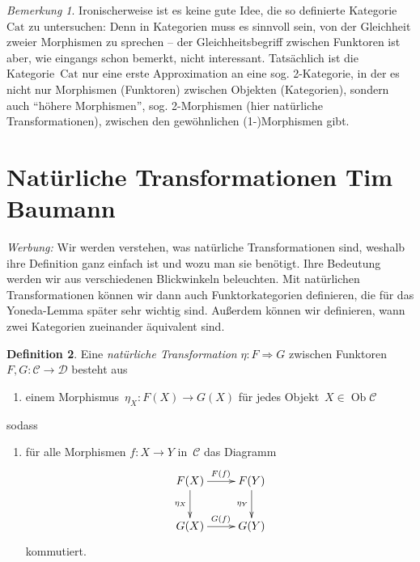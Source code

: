 \documentclass[a4paper,ngerman]{scrartcl}
\theoremstyle{definition}
\newtheorem{defn}{Definition}[section]
\theoremstyle{plain}
\theoremstyle{remark}
\newtheorem{bem}[defn]{Bemerkung}
\newcommand{\C}{\mathcal{C}}
\newcommand{\D}{\mathcal{D}}
\DeclareMathOperator{\Ob}{Ob}
\newcommand{\Cat}{\mathrm{Cat}}
\begin{document}
\begin{bem}Ironischerweise ist es keine gute Idee, die so definierte
Kategorie~$\Cat$ zu untersuchen: Denn in Kategorien muss es sinnvoll sein, von
der Gleichheit zweier Morphismen zu sprechen -- der Gleichheitsbegriff zwischen
Funktoren ist aber, wie eingangs schon bemerkt, nicht interessant. Tatsächlich ist
die Kategorie~$\Cat$ nur eine erste Approximation an eine sog. 2-Kategorie, in
der es nicht nur Morphismen (Funktoren) zwischen Objekten (Kategorien), sondern
auch "`höhere Morphismen"', sog. 2-Morphismen (hier natürliche
Transformationen), zwischen den gewöhnlichen (1-)Morphismen gibt.
\end{bem}



\section[Natürliche Transformationen]{Natürliche Transformationen \hfill \small
Tim Baumann}

\emph{Werbung:} Wir werden verstehen, was natürliche Transformationen sind,
weshalb ihre Definition ganz einfach ist und wozu man sie benötigt. Ihre
Bedeutung werden wir aus verschiedenen Blickwinkeln beleuchten. Mit natürlichen
Transformationen können wir dann auch Funktorkategorien definieren, die für das
Yoneda-Lemma später sehr wichtig sind. Außerdem können wir definieren, wann
zwei Kategorien zueinander äquivalent sind.

\begin{defn}Eine \emph{natürliche Transformation} $\eta : F \Rightarrow G$
zwischen Funktoren $F, G : \C \to \D$ besteht aus
\begin{enumerate}
\item[] einem Morphismus~$\eta_X : F(X) \to G(X)$ für jedes Objekt~$X \in \Ob \C$
\end{enumerate}
sodass
\begin{enumerate}
\item[]
für alle Morphismen $f : X \to Y$ in~$\C$ das Diagramm
\[ \xymatrix{
  F(X) \ar[r]^{F(f)} \ar[d]_{\eta_X} & F(Y) \ar[d]_{\eta_Y} \\
  G(X) \ar[r]^{G(f)} & G(Y)
} \]
kommutiert.
\end{enumerate}
\end{defn}
\end{document}
